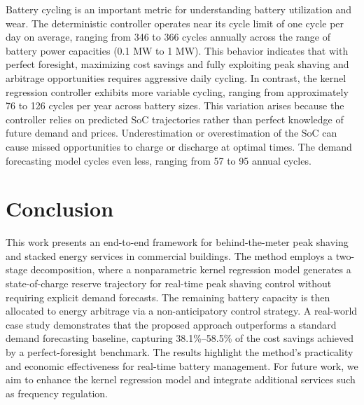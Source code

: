 \documentclass[conference]{IEEEtran}
\begin{document}
Battery cycling is an important metric for understanding battery utilization and wear. %
The deterministic controller operates near its cycle limit of one cycle per day on average, ranging from 346 to 366 cycles annually across the range of battery power capacities (0.1 MW to 1 MW). This behavior indicates that with perfect foresight, maximizing cost savings and fully exploiting peak shaving and arbitrage opportunities requires aggressive daily cycling.
In contrast, the kernel regression controller exhibits more variable cycling, ranging from approximately 76 to 126 cycles per year across battery sizes. This variation arises because the controller relies on predicted SoC trajectories rather than perfect knowledge of future demand and prices. Underestimation or overestimation of the SoC can cause missed opportunities to charge or discharge at optimal times. The demand forecasting model cycles even less, ranging from 57 to 95 annual cycles.


\section{Conclusion}\label{conclusion}

This work presents an end-to-end framework for behind-the-meter peak shaving and stacked energy services in commercial buildings. The method employs a two-stage decomposition, where a nonparametric kernel regression model generates a state-of-charge reserve trajectory for real-time peak shaving control without requiring explicit demand forecasts. The remaining battery capacity is then allocated to energy arbitrage via a non-anticipatory control strategy. A real-world case study demonstrates that the proposed approach outperforms a standard demand forecasting baseline, capturing 38.1\%–58.5\% of the cost savings achieved by a perfect-foresight benchmark. The results highlight the method’s practicality and economic effectiveness for real-time battery management. For future work, we aim to enhance the kernel regression model and integrate additional services such as frequency regulation.
\end{document}
